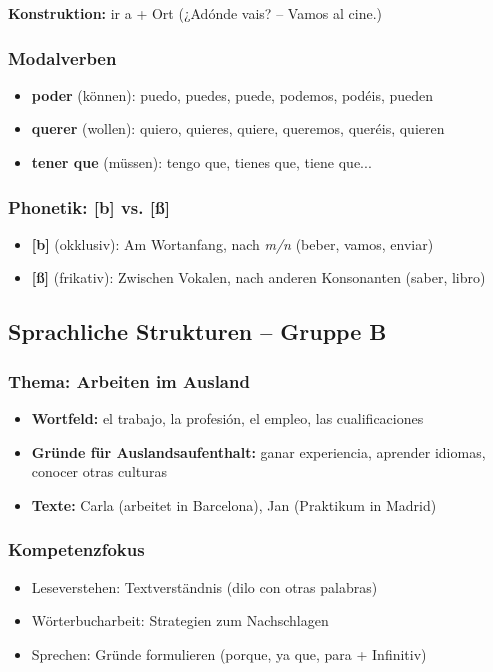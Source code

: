 \documentclass[11pt,a4paper]{article}
\begin{document}
\textbf{Konstruktion:} ir a + Ort (¿Adónde vais? -- Vamos al cine.)

\subsubsection{Modalverben}
\begin{itemize}
    \item \textbf{poder} (können): puedo, puedes, puede, podemos, podéis, pueden
    \item \textbf{querer} (wollen): quiero, quieres, quiere, queremos, queréis, quieren
    \item \textbf{tener que} (müssen): tengo que, tienes que, tiene que...
\end{itemize}

\subsubsection{Phonetik: [b] vs. [\ss]}
\begin{itemize}
    \item \textbf{[b]} (okklusiv): Am Wortanfang, nach \textit{m/n} (beber, vamos, enviar)
    \item \textbf{[\ss]} (frikativ): Zwischen Vokalen, nach anderen Konsonanten (saber, libro)
\end{itemize}

\subsection{Sprachliche Strukturen -- Gruppe B}

\subsubsection{Thema: Arbeiten im Ausland}
\begin{itemize}
    \item \textbf{Wortfeld:} el trabajo, la profesión, el empleo, las cualificaciones
    \item \textbf{Gründe für Auslandsaufenthalt:} ganar experiencia, aprender idiomas, conocer otras culturas
    \item \textbf{Texte:} Carla (arbeitet in Barcelona), Jan (Praktikum in Madrid)
\end{itemize}

\subsubsection{Kompetenzfokus}
\begin{itemize}
    \item Leseverstehen: Textverständnis (dilo con otras palabras)
    \item Wörterbucharbeit: Strategien zum Nachschlagen
    \item Sprechen: Gründe formulieren (porque, ya que, para + Infinitiv)
\end{itemize}
\end{document}

